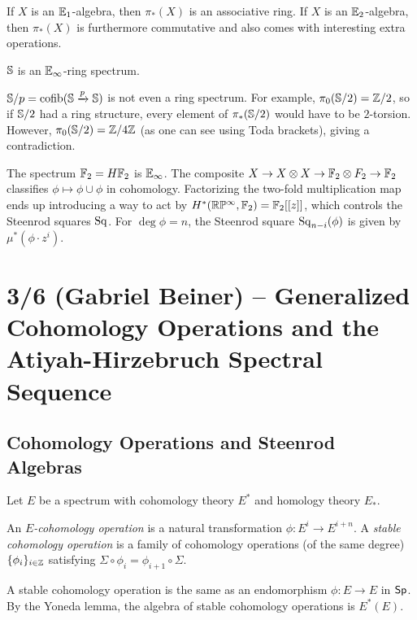 \documentclass{article}
\begin{document}
If $X$ is an $\mathbb{E}_1$-algebra, then $\pi_*(X)$ is an associative ring.
If $X$ is an $\mathbb{E}_2$-algebra, then $\pi_*(X)$ is furthermore commutative and also comes with interesting extra operations.

\begin{ex}
	$\mathbb{S}$ is an $\mathbb{E}_\infty$-ring spectrum.
\end{ex}

\begin{ex}
	$\mathbb{S} / p = \operatorname{cofib}(\mathbb{S} \xrightarrow{p} \mathbb{S})$ is not even a ring spectrum.
	For example, $\pi_0(\mathbb{S} / 2) = \mathbb{Z} / 2$, so if $\mathbb{S} / 2$ had a ring structure, every element of $\pi_*(\mathbb{S} / 2)$ would have to be $2$-torsion.
	However, $\pi_0(\mathbb{S} / 2) = \mathbb{Z} / 4 \mathbb{Z}$ (as one can see using Toda brackets), giving a contradiction.
\end{ex}

\begin{ex}
	The spectrum $\mathbb{F}_2 = H\mathbb{F}_2$ is $\mathbb{E}_\infty$.
	The composite $X \to X \otimes X \to \mathbb{F}_2 \otimes F_2 \to \mathbb{F}_2$ classifies $\phi \mapsto \phi \cup \phi$ in cohomology.
	Factorizing the two-fold multiplication map ends up introducing a way to act by $H^*(\mathbb{R}\mathbb{P}^\infty, \mathbb{F}_2) = \mathbb{F}_2[[z]]$, which controls the Steenrod squares $\mathrm{Sq}$.
	For $\deg \phi = n$, the Steenrod square $\mathrm{Sq}_{n-i}(\phi)$ is given by $\mu^*(\phi \cdot z^i)$.
\end{ex}

\section{3/6 (Gabriel Beiner) -- Generalized Cohomology Operations and the Atiyah-Hirzebruch Spectral Sequence}

\subsection{Cohomology Operations and Steenrod Algebras}

Let $E$ be a spectrum with cohomology theory $E^*$ and homology theory $E_*$.

\begin{dfn}
	An \emph{$E$-cohomology operation} is a natural transformation $\phi: E^i \to E^{i+n}$.
	A \emph{stable cohomology operation} is a family of cohomology operations (of the same degree) $\{ \phi_i \}_{i \in \mathbb{Z}}$ satisfying $\Sigma \circ \phi_i = \phi_{i+1} \circ \Sigma$.
\end{dfn}

A stable cohomology operation is the same as an endomorphism $\phi: E \to E$ in $\mathsf{Sp}$.
By the Yoneda lemma, the algebra of stable cohomology operations is $E^*(E)$.
\end{document}
